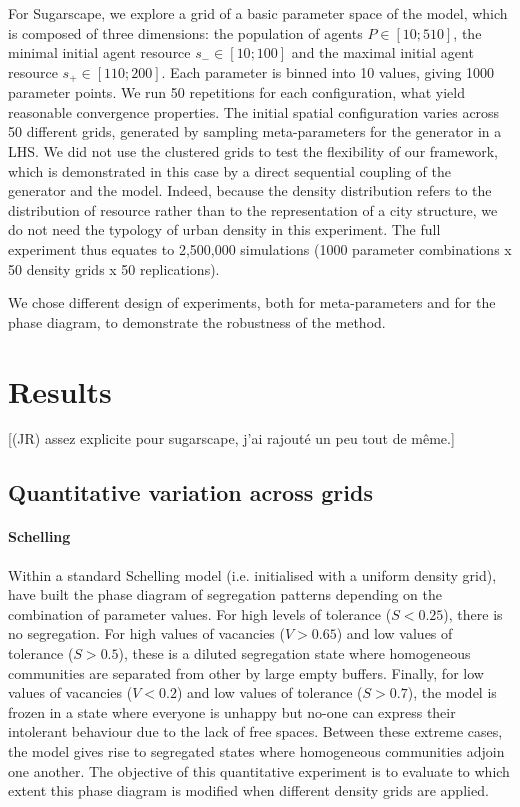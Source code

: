 \documentclass[Royal,sageh,times]{sagej}
\begin{document}
For Sugarscape, we explore a grid of a basic parameter space of the model, which is composed of three dimensions: the population of agents $P\in \left[10;510\right]$, the minimal initial agent resource $s_{-}\in \left[10;100\right]$ and the maximal initial agent resource $s_{+}\in \left[110;200\right]$. Each parameter is binned into 10 values, giving 1000 parameter points. We run 50 repetitions for each configuration, what yield reasonable convergence properties. The initial spatial configuration varies across 50 different grids, generated by sampling meta-parameters for the generator in a LHS. We did not use the clustered grids to test the flexibility of our framework, which is demonstrated in this case by a direct sequential coupling of the generator and the model. Indeed, because the density distribution refers to the distribution of resource rather than to the representation of a city structure, we do not need the typology of urban density in this experiment. The full experiment thus equates to 2,500,000 simulations (1000 parameter combinations x 50 density grids x 50 replications). 


We chose different design of experiments, both for meta-parameters and for the phase diagram, to demonstrate the robustness of the method.




\section{Results}

[(JR) assez explicite pour sugarscape, j'ai rajouté un peu tout de même.]

\subsection{Quantitative variation across grids}
\paragraph{Schelling} 
Within a standard Schelling model (i.e. initialised with a uniform density grid), \citet{Gauvinetal2009} have built the phase diagram of segregation patterns depending on the combination of parameter values. For high levels of tolerance ($S < 0.25$), there is no segregation. For high values of vacancies ($V > 0.65$) and low values of tolerance ($S > 0.5$), these is a diluted segregation state where homogeneous communities are separated from other by large empty buffers. Finally, for low values of vacancies ($V < 0.2$) and low values of tolerance ($S > 0.7$), the model is frozen in a state where everyone is unhappy but no-one can express their intolerant behaviour due to the lack of free spaces. Between these extreme cases, the model gives rise to segregated states where homogeneous communities adjoin one another. The objective of this quantitative experiment is to evaluate to which extent this phase diagram is modified when different density grids are applied. 
\end{document}
